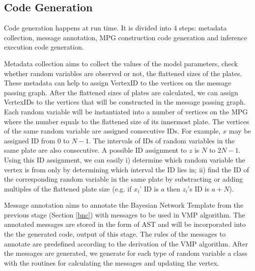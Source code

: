 \subsection{Code Generation}

Code generation happens at run time. It is divided into 4 steps: metadata
collection, message annotation, MPG construction code generation and inference
execution code generation.

Metadata collection aims to collect the values of the model parameters,
check whether random variables are observed or not, the flattened sizes of the plates.
These metadata can help to 
assign VertexID to the vertices on the message passing graph.  
After the flattened sizes of plates are calculated, we can assign VertexIDs to the
vertices that will be constructed in the message passing graph. Each random
variable will be instantiated into a number of vertices on the MPG where the
number equals to the flattened size of its innermost plate. The vertices
of the same random variable are assigned consecutive IDs. For example, $x$ may
be assigned ID from $0$ to $N-1$. The intervals of IDs of random variables in
the same plate are also consecutive. A possible ID assignment to $z$ is $N$ to
$2N - 1$. Using this ID assignment, we can easily i) determine which random
variable the vertex is from only by determining which interval the ID lies
in; ii) find the ID of the corresponding random variable in the same plate by
substracting or adding multiples of the flattened plate size (e.g. if $x_i$' ID is
$a$ then $z_i$'s ID is $a + N$).

Message annotation aims to annotate the Bayesian Network Template from the previous stage (Section \ref{bnc})
with messages
to be used in VMP algorithm.  The annotated messages are stored in the form of
AST and will be incorporated into the the generated code, output of this stage. 
The rules of the messages to annotate are predefined according to the
derivation of the VMP algorithm.
%
After the messages are generated, we
generate for each type of random variable a class with the routines for
calculating the messages and updating the vertex. 

